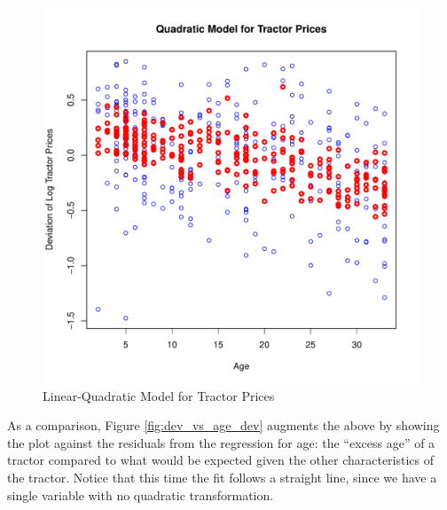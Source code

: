 \documentclass[11pt]{paper}
\begin{document}
\begin{figure}[h!]
  \centering
  \includegraphics[scale = 0.5, keepaspectratio=true]{../Figures/dev_vs_age}
  \caption{Linear-Quadratic Model for Tractor Prices} \label{fig:dev_vs_age}
\end{figure}



\pagebreak
As a comparison, Figure \ref{fig:dev_vs_age_dev} 
augments the above by showing the plot against the 
residuals from the regression for age:
the ``excess age'' of a tractor compared to what would be 
expected given the other characteristics of the tractor. 
Notice that this time the fit follows a straight line,
since we have a single variable with no
quadratic transformation.
\end{document}
